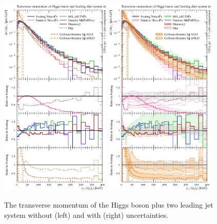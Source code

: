 \begin{figure}[t!]
  \centering
  \includegraphics[width=0.47\textwidth]{figures/hjetscomp_u_Hjj_pT_incl.pdf}
  \hfill
  \includegraphics[width=0.47\textwidth]{figures/hjetscomp_Hjj_pT_incl.pdf}
  \caption{
    The transverse momentum of the Higgs boson plus two leading jet
    system without (left) and with (right) uncertainties.
    \label{fig:higgscomp:results:2obs:hjj_pt}
  }
\end{figure}

